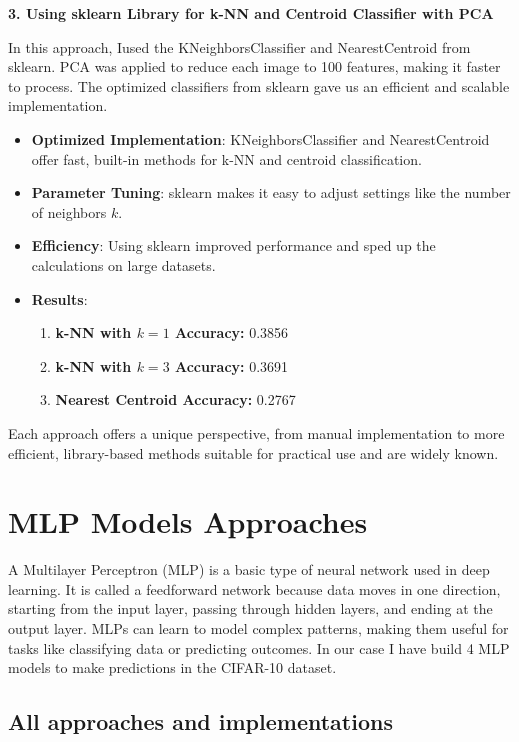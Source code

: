 \documentclass[lettersize,journal]{IEEEtran}
\begin{document}
\vspace{0.3cm}

\textbf{3. Using sklearn Library for k-NN and Centroid Classifier with PCA}

In this approach, Iused the KNeighborsClassifier and NearestCentroid from sklearn. PCA was applied to reduce each image to 100 features, making it faster to process. The optimized classifiers from sklearn gave us an efficient and scalable implementation.

\begin{itemize}
    \item \textbf{Optimized Implementation}: KNeighborsClassifier and NearestCentroid offer fast, built-in methods for k-NN and centroid classification.
    \item \textbf{Parameter Tuning}: sklearn makes it easy to adjust settings like the number of neighbors \( k \).
    \item \textbf{Efficiency}: Using sklearn improved performance and sped up the calculations on large datasets.
    \item \textbf{Results}:
    \begin{enumerate}
        \item \textbf{k-NN with \( k = 1 \) Accuracy:} 0.3856
        \item \textbf{k-NN with \( k = 3 \) Accuracy:} 0.3691
        \item \textbf{Nearest Centroid Accuracy:} 0.2767
    \end{enumerate}
\end{itemize}

Each approach offers a unique perspective, from manual implementation to more efficient, library-based methods suitable for practical use and are widely known.

\section{MLP Models Approaches}
A Multilayer Perceptron (MLP) is a basic type of neural network used in deep learning. It is called a feedforward network because data moves in one direction, starting from the input layer, passing through hidden layers, and ending at the output layer. MLPs can learn to model complex patterns, making them useful for tasks like classifying data or predicting outcomes. In our case I have build 4 MLP models to make predictions in the CIFAR-10 dataset.

\subsection{\textbf{All approaches and implementations}}
\end{document}
